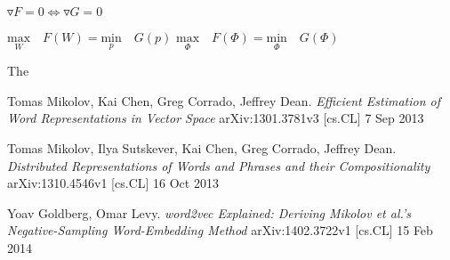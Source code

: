 \documentclass[]{article}
\begin{document}
$\triangledown F = 0 \iff \triangledown G = 0$

$\underset{W}{\text{max}} \quad F(W) = \underset{p}{\text{min}} \quad G(p)$
$\underset{\Phi}{\text{max}} \quad F(\Phi) = \underset{\Phi}{\text{min}} \quad G(\Phi)$

\noindent The 

\begin{thebibliography}{1}
	 Tomas Mikolov, Kai Chen, Greg Corrado, Jeffrey Dean. {\em Efficient Estimation of Word Representations in Vector Space} arXiv:1301.3781v3 [cs.CL] 7 Sep 2013
	
	 Tomas Mikolov, Ilya Sutskever, Kai Chen, Greg Corrado, Jeffrey Dean. {\em Distributed Representations of Words and Phrases and their Compositionality} arXiv:1310.4546v1  [cs.CL]  16 Oct 2013
	
	 Yoav Goldberg, Omar Levy. {\em word2vec Explained: Deriving Mikolov et al.'s Negative-Sampling Word-Embedding Method} arXiv:1402.3722v1  [cs.CL]  15 Feb 2014
	
\end{thebibliography}
\end{document}
